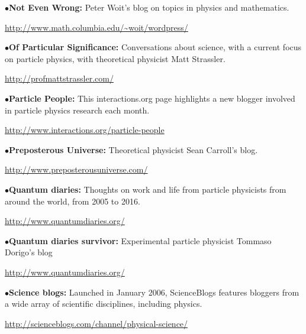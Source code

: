 \medskip

\item{$\bullet$}{\bf Not Even Wrong:} 
Peter Woit's blog on topics in physics and mathematics.
	\item{}\qquad\url{http://www.math.columbia.edu/~woit/wordpress/}

\medskip

\item{$\bullet$}{\bf Of Particular Significance:}
Conversations about science, with a current focus on particle physics, with theoretical physicist Matt Strassler.
	\item{}\qquad\url{http://profmattstrassler.com/}

\medskip

\item{$\bullet$}{\bf Particle People:} 
This interactions.org page highlights a new blogger involved in particle physics research each month.
	\item{}\qquad\url{http://www.interactions.org/particle-people}

\medskip

\item{$\bullet$}{\bf Preposterous Universe:}
Theoretical physicist Sean Carroll's blog.
	\item{}\qquad\url{http://www.preposterousuniverse.com/}

\medskip

\item{$\bullet$}{\bf Quantum diaries:}
Thoughts on work and life from particle physicists from around the world, from 2005 to 2016. 
	\item{}\qquad\url{http://www.quantumdiaries.org/}


\medskip

\item{$\bullet$}{\bf Quantum diaries survivor:}
Experimental particle physicist Tommaso Dorigo’s blog 
	\item{}\qquad\url{http://www.quantumdiaries.org/}

\medskip

\item{$\bullet$}{\bf Science blogs:} 
Launched in January 2006, ScienceBlogs features bloggers from a wide array of scientific disciplines, including physics.
	\item{}\qquad\url{http://scienceblogs.com/channel/physical-science/}

